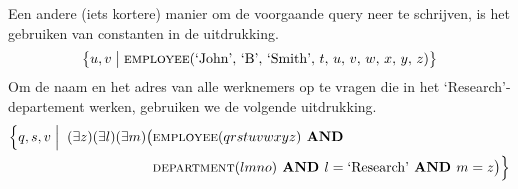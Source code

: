 Een andere (iets kortere) manier om de voorgaande query neer te schrijven, is het gebruiken van constanten in de uitdrukking.
\vspace{-2mm}
\[ \big\{ u,v \bigm| \textsc{employee}(\text{`John'},\, \text{`B'},\, \text{`Smith'},\, t,\, u,\, v,\, w,\, x,\, y,\, z) \big\} \]
Om de naam en het adres van alle werknemers op te vragen die in het `Research'-departement werken, gebruiken we de volgende uitdrukking.
\begin{align*}
\Big\{ q,s,v \Bigm| \;(\exists z)(\exists l)(\exists m) \big( &\textsc{employee}(qrstuvwxyz) \textbf{ AND } \\
&\textsc{department}(lmno) \textbf{ AND } l=\text{`Research'} \textbf{ AND } m=z \big) \Big\}
\end{align*}
